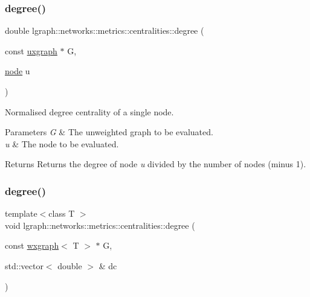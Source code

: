 \subsubsection{\texorpdfstring{degree()}{degree()}\hspace{0.1cm}{\footnotesize\ttfamily [2/4]}}
{\footnotesize\ttfamily double lgraph\+::networks\+::metrics\+::centralities\+::degree (\begin{DoxyParamCaption}\item[{const \hyperlink{classlgraph_1_1uxgraph}{uxgraph} $\ast$}]{G,  }\item[{\hyperlink{namespacelgraph_a397169dd66adf725210a30fb7251773e}{node}}]{u }\end{DoxyParamCaption})}



Normalised degree centrality of a single node. 


\begin{DoxyParams}{Parameters}
{\em G} & The unweighted graph to be evaluated. \\
\hline
{\em u} & The node to be evaluated. \\
\hline
\end{DoxyParams}
\begin{DoxyReturn}{Returns}
Returns the degree of node {\itshape u} divided by the number of nodes (minus 1). 
\end{DoxyReturn}
\mbox{\label{namespacelgraph_1_1networks_1_1metrics_1_1centralities_a20747beaa4dd97bc96cf153afecc464e}} 
\subsubsection{\texorpdfstring{degree()}{degree()}\hspace{0.1cm}{\footnotesize\ttfamily [3/4]}}
{\footnotesize\ttfamily template$<$class T $>$ \\
void lgraph\+::networks\+::metrics\+::centralities\+::degree (\begin{DoxyParamCaption}\item[{const \hyperlink{classlgraph_1_1wxgraph}{wxgraph}$<$ T $>$ $\ast$}]{G,  }\item[{std\+::vector$<$ double $>$ \&}]{dc }\end{DoxyParamCaption})}




